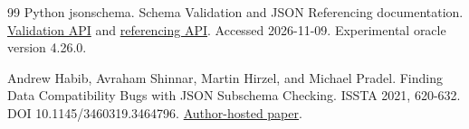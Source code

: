 \documentclass[sigconf,nonacm]{acmart}
\begin{document}
\begin{thebibliography}{99}
 Python jsonschema. Schema Validation and JSON Referencing documentation. \href{https://python-jsonschema.readthedocs.io/en/stable/validate/}{Validation API} and \href{https://python-jsonschema.readthedocs.io/en/stable/referencing/}{referencing API}. Accessed 2026-11-09. Experimental oracle version 4.26.0.

 Andrew Habib, Avraham Shinnar, Martin Hirzel, and Michael Pradel. Finding Data Compatibility Bugs with JSON Subschema Checking. ISSTA 2021, 620-632. DOI 10.1145/3460319.3464796. \href{https://andrewhabib.org/publications/issta21-JSONSubschema.pdf}{Author-hosted paper}.

\end{thebibliography}
\end{document}
